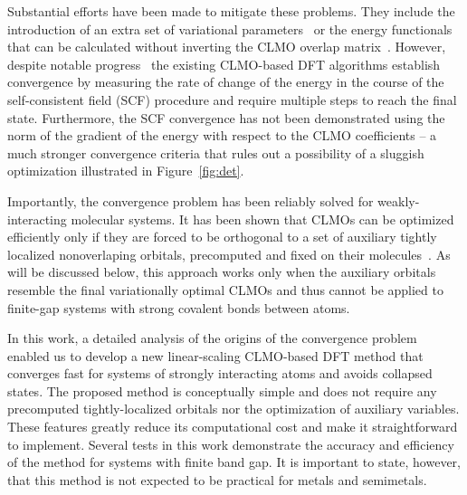 \documentclass[aps,prl,twocolumn,reprint,amsmath,amssymb]{revtex4-1}
\begin{document}
Substantial efforts have been made to mitigate these problems. 
They include the introduction of an extra set of variational parameters~\cite{yang1997absolute,burger2008linear, peng2013effective} or the energy functionals that can be calculated without inverting the CLMO overlap matrix~\cite{mauri1993orbital,kim1995total,ordejon1995linear}. 
However, despite notable progress~\cite{fattebert2004linear, fattebert2006linear, osei2014accurate} the existing CLMO-based DFT algorithms establish convergence by measuring the rate of change of the energy in the course of the self-consistent field (SCF) procedure and require multiple steps to reach the final state. 
Furthermore, the SCF convergence has not been demonstrated using the norm of the gradient of the energy with respect to the CLMO coefficients -- a much stronger convergence criteria that rules out a possibility of a sluggish optimization illustrated in Figure~\ref{fig:det}.

Importantly, the convergence problem has been reliably solved for weakly-interacting molecular systems. 
It has been shown that CLMOs can be optimized efficiently only if they are forced to be orthogonal to a set of auxiliary tightly localized nonoverlaping orbitals, precomputed and fixed on their molecules~\cite{tsuchida2007augmented, tsuchida2008ab, khaliullin2013efficient}. 
As will be discussed below, this approach works only when the auxiliary orbitals resemble the final variationally optimal CLMOs and thus cannot be applied to finite-gap systems with strong covalent bonds between atoms. 

In this work, a detailed analysis of the origins of the convergence problem enabled us to develop a new linear-scaling CLMO-based DFT method that converges fast for systems of strongly interacting atoms and avoids collapsed states. The proposed method is conceptually simple and does not require any precomputed tightly-localized orbitals nor the optimization of auxiliary variables. These features greatly reduce its computational cost and make it straightforward to implement. Several tests in this work demonstrate the accuracy and efficiency of the method for systems with finite band gap. It is important to state, however, that this method is not expected to be practical for metals and semimetals.

\end{document}
